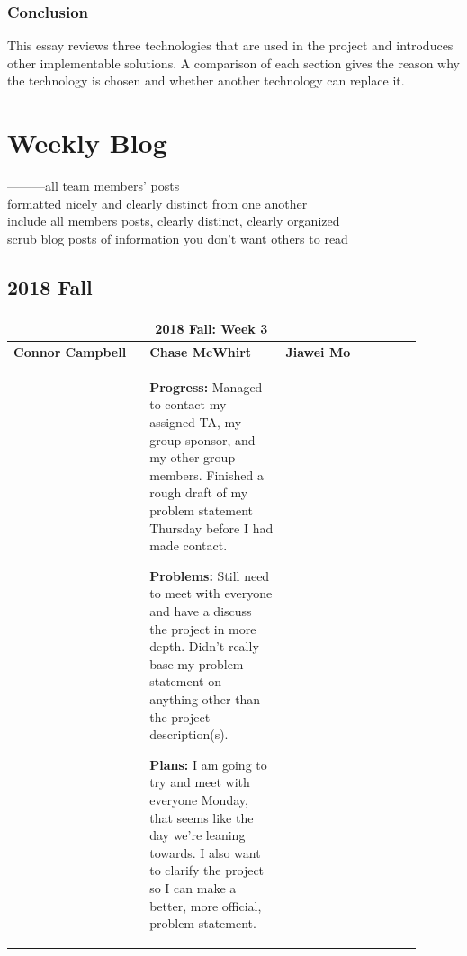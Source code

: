 \documentclass[10pt,journal,compsoc, draftclsnofoot,onecolumn]{IEEEtran}
\begin{document}
\subsubsection{Conclusion}
This essay reviews three technologies that are used in the project and introduces other implementable solutions. A comparison of each section gives the reason why the technology is chosen and whether another technology can replace it. 


\newpage
\section{Weekly Blog}
---------all team members' posts \\
formatted nicely and clearly distinct from one another \\
include all members posts, clearly distinct, clearly organized \\
scrub blog posts of information you don't want others to read \\

\subsection{2018 Fall}
\begin{center}
\begin{tabular}{|p{0.3\linewidth}|p{0.3\linewidth}|p{0.3\linewidth}|}
\hline
\multicolumn{3}{|c|}{\textbf{2018 Fall: Week 3}} \\
\hline
\textbf{Connor Campbell} & \textbf{Chase McWhirt} & \textbf{Jiawei Mo} \\ [0.5ex]
\hline\hline


&
\textbf{Progress:} Managed to contact my assigned TA, my group sponsor, and my other group members.
Finished a rough draft of my problem statement Thursday before I had made contact.

\textbf{Problems:} Still need to meet with everyone and have a discuss the project in more depth.
Didn't really base my problem statement on anything other than the project description(s).

\textbf{Plans:} I am going to try and meet with everyone Monday, that seems like the day we're leaning towards.
I also want to clarify the project so I can make a better, more official, problem statement.
&

\\ \hline
\end{tabular}
\end{center}
\end{document}
